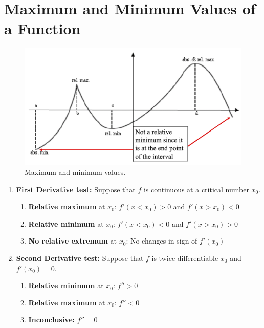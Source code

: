 \section{Maximum and Minimum Values of a Function}
	
\begin{figure}[h!]
	\centering
	\includegraphics[width=0.9\linewidth]{chapter3/max-min}
	\caption{Maximum and minimum values.}
	\label{fig:max-min}
\end{figure}


\begin{myframe}[arc=10pt,auto outer arc]
	\begin{enumerate}
	\item \textbf{First Derivative test:} Suppose that $f$ is continuous at a critical number $x_0$.
	\begin{enumerate}
		\item  \textbf{Relative maximum} at $x_0$: $f'(x < x_0) > 0$ and $f'(x > x_0) < 0$
		\item  \textbf{Relative minimum} at $x_0$: $f'(x < x_0) < 0$ and $f'(x > x_0) > 0$
		\item  \textbf{No relative extremum} at $x_0$: No changes in sign of $f'(x_0)$
	\end{enumerate}
	
	
	\item \textbf{Second Derivative test:} Suppose that $f$ is twice differentiable $x_0$ and $f'(x_0)=0$.
		\begin{enumerate}
			\item \textbf{Relative minimum} at $x_0$: $f'' > 0$
			\item \textbf{Relative maximum} at $x_0$: $f'' < 0$
			\item \textbf{Inconclusive:} $f'' = 0$
    	\end{enumerate}
	
	\end{enumerate}
\end{myframe}

\newpage
{}


